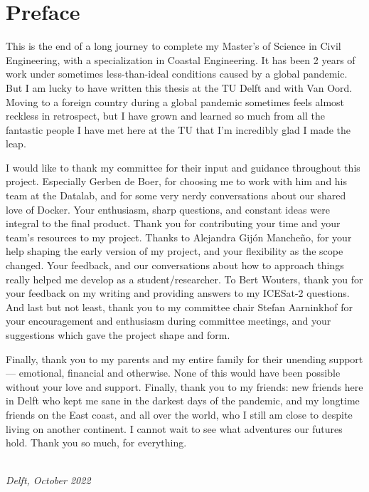 \chapter*{Preface}


This is the end of a long journey to complete my Master's of Science in Civil Engineering, with a specialization in Coastal Engineering. It has been 2 years of work under sometimes less-than-ideal conditions caused by a global pandemic. But I am lucky to have written this thesis at the TU Delft and with Van Oord. Moving to a foreign country during a global pandemic sometimes feels almost reckless in retrospect, but I have grown and learned so much from all the fantastic people I have met here at the TU that I'm incredibly glad I made the leap.  



I would like to thank my committee for their input and guidance throughout this project. Especially Gerben de Boer, for choosing me to work with him and his team at the Datalab, and for some very nerdy conversations about our shared love of Docker. Your enthusiasm, sharp questions, and constant ideas were integral to the final product. Thank you for contributing your time and your team's resources to my project. Thanks to Alejandra Gijón Mancheño, for your help shaping the early version of my project, and your flexibility as the scope changed. Your feedback, and our conversations about how to approach things really helped me develop as a student/researcher. To Bert Wouters, thank you for your feedback on my writing and providing answers to my ICESat-2 questions. And last but not least, thank you to my committee chair Stefan Aarninkhof for your encouragement and enthusiasm during committee meetings, and your suggestions which gave the project shape and form.



Finally, thank you to my parents and my entire family for their unending support --- emotional, financial and otherwise. None of this would have been possible without your love and support. Finally, thank you to my friends: new friends here in Delft who kept me sane in the darkest days of the pandemic, and my longtime friends on the East coast, and all over the world, who I still am close to despite living on another continent. I cannot wait to see what adventures our futures hold. Thank you so much, for everything.

\begin{flushright}
{\makeatletter\itshape
    \@author \\
    Delft, October 2022
\makeatother}
\end{flushright}


